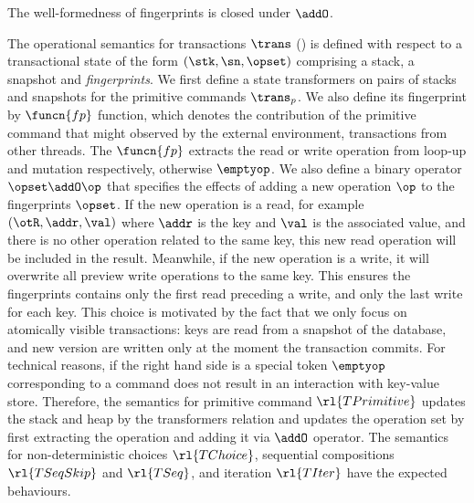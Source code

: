 \begin{lemma}
The well-formedness of fingerprints is closed under \( \addO \).
\end{lemma}

The operational semantics for transactions \(\trans\) () is defined with respect to a transactional state of the form \((\stk, \sn, \opset)\) comprising a stack, a snapshot and \emph{fingerprints}.
We first define a state transformers on pairs of stacks and snapshots for the primitive commands \(\trans_{p}\).
We also define its fingerprint by \( \funcn{fp} \) function, which denotes the contribution of the primitive command that might observed by the external environment, \ie transactions from other threads.
The \( \funcn{fp} \) extracts the read or write operation from loop-up and mutation respectively, otherwise \( \emptyop \).
We also define a binary operator \( \opset \addO \op \) that specifies the effects of adding a new operation \( \op \) to the fingerprints \( \opset \).
If the new operation is a read, for example \((\otR, \addr, \val)\) where \( \addr \) is the key and \( \val\) is the associated value, and there is no other operation related to the same key, this new read operation will be included in the result.
Meanwhile, if the new operation is a write, it will overwrite all preview write operations to the same key.
This ensures the fingerprints contains only the first read preceding a write, and only the last write for each key.
This choice is motivated by the fact that we only focus on atomically visible transactions: keys are read from a snapshot of the database, and new version are written only at the moment the transaction commits.
For technical reasons, if the right hand side is a special token \( \emptyop \) corresponding to a command does not result in an interaction with key-value store.
Therefore, the semantics for primitive command \(\rl{TPrimitive}\) updates the stack and heap by the transformers relation and updates the operation set by first extracting the operation and adding it via \( \addO \) operator.
The semantics for non-deterministic choices \(\rl{TChoice}\), sequential compositions \(\rl{TSeqSkip}\) and \(\rl{TSeq}\), and iteration \(\rl{TIter}\) have the expected behaviours.

